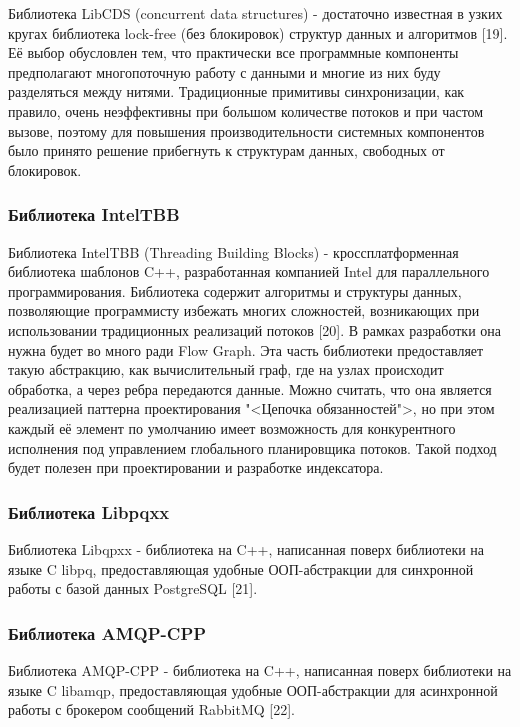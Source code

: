 Библиотека LibCDS (concurrent data structures) - достаточно известная в узких кругах библиотека lock-free (без блокировок) структур данных и алгоритмов [19]. Её выбор обусловлен тем, что практически все программные компоненты предполагают многопоточную работу с данными и многие из них буду разделяться между нитями. Традиционные примитивы синхронизации, как правило, очень неэффективны при большом количестве потоков и при частом вызове, поэтому для повышения производительности системных компонентов было принято решение прибегнуть к структурам данных, свободных от блокировок.

\subsubsection{Библиотека IntelTBB}

Библиотека IntelTBB (Threading Building Blocks) - кроссплатформенная библиотека шаблонов C++, разработанная компанией Intel для параллельного программирования. Библиотека содержит алгоритмы и структуры данных, позволяющие программисту избежать многих сложностей, возникающих при использовании традиционных реализаций потоков [20]. В рамках разработки она нужна будет во много ради Flow Graph. Эта часть библиотеки предоставляет такую абстракцию, как вычислительный граф, где на узлах происходит обработка, а через ребра передаются данные. Можно считать, что она является реализацией паттерна проектирования "<Цепочка обязанностей">, но при этом каждый её элемент по умолчанию имеет возможность для конкурентного исполнения под управлением глобального планировщика потоков. Такой подход будет полезен при проектировании и разработке индексатора.

\subsubsection{Библиотека Libpqxx}

Библиотека Libqpxx - библиотека на C++, написанная поверх библиотеки на языке C libpq, предоставляющая удобные ООП-абстракции для синхронной работы с базой данных PostgreSQL [21].

\subsubsection{Библиотека AMQP-CPP}

Библиотека AMQP-CPP - библиотека на C++, написанная поверх библиотеки на языке C libamqp, предоставляющая удобные ООП-абстракции для асинхронной работы с брокером сообщений RabbitMQ [22].

